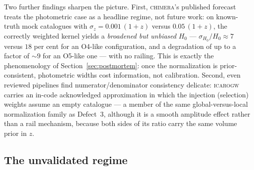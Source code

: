 Two further findings sharpen the picture. First, \textsc{chimera}'s published forecast treats the photometric case as a headline regime, not future work: on known-truth mock catalogues with $\sigma_z = 0.001\,(1+z)$ versus $0.05\,(1+z)$, the correctly weighted kernel yields a \emph{broadened but unbiased} $H_0$ --- $\sigma_{H_0}/H_0 \approx 7$ versus $18$ per cent for an O4-like configuration, and a degradation of up to a factor of $\sim 9$ for an O5-like one --- with no railing. %
This is exactly the phenomenology of Section~\ref{sec:postmortem}: once the normalization is prior-consistent, photometric widths cost information, not calibration. Second, even reviewed pipelines find numerator/denominator consistency delicate: \textsc{icarogw} carries an in-code acknowledged approximation in which the injection (selection) weights assume an empty catalogue --- a member of the same global-versus-local normalization family as Defect~3, although it is a smooth amplitude effect rather than a rail mechanism, because both sides of its ratio carry the same volume prior in $z$. %

\subsection{The unvalidated regime}

